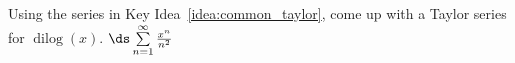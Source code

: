 {\label{dilog1}Using the series in Key Idea~\ref{idea:common_taylor}, come up with a Taylor series for $\operatorname{dilog}(x)$.
}
{$\ds \sum\limits_{n=1}^{\infty} \frac{x^n}{n^2}$
}